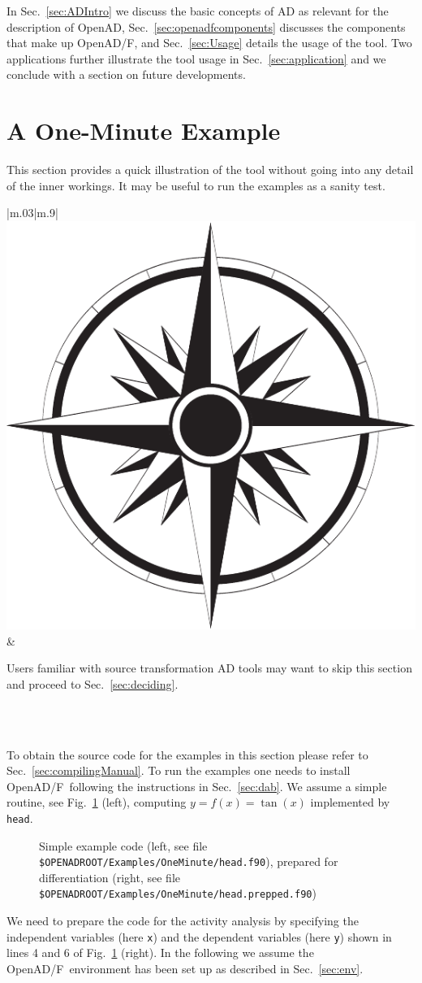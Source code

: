 \documentclass{book}
\newcommand{\OpenADF}{OpenAD/F}
\newcommand{\OpenAD}{OpenAD}
\newcommand{\refsec}[1]{{Sec.~\ref{#1}}}
\newcommand{\reffig}[1]{{Fig.~\ref{#1}}}
\newcommand{\nav}[1]{
\begin{tabular}{|m{.03\textwidth}|m{.9\textwidth}|}\hline
\vspace{1mm}
\includegraphics[width=.03\textwidth]{windrose_zh1}&
\vspace{1mm}
\begin{minipage}[c]{.86\textwidth}
\small {#1}
\end{minipage}
\vspace{1mm}
\\\hline
\end{tabular}
}
\begin{document}
In \refsec{sec:ADIntro} we discuss the basic concepts of AD as relevant for 
the description of \OpenAD, \refsec{sec:openadfcomponents} discusses the components 
that make up \OpenADF, and \refsec{sec:Usage} details the usage of the tool. 
Two applications further illustrate the tool usage in \refsec{sec:application} and 
we conclude with a section on future developments.

\section{A One-Minute Example} \label{sec:oneMinute}

This section provides a quick illustration of the tool without going into any detail of 
the inner workings. It may be useful to run the examples as a sanity test. \\
\nav{Users familiar with source transformation AD tools may want to skip this section and proceed  to \refsec{sec:deciding}.}\\
To obtain the source code for the examples in this section please refer to \refsec{sec:compilingManual}. 
To run the examples one needs to install \OpenADF\ following the instructions in \refsec{sec:dab}.
We assume a simple routine, see \reffig{fig:OneMinute} (left), computing $y=f(x)=\tan(x)$ implemented by \lstinline{head}.
\begin{figure}
\begin{minipage}[t]{.48\linewidth}
\scriptsize
\end{minipage}
\begin{minipage}[t]{.48\linewidth}
\scriptsize
\end{minipage}
\caption{Simple example code (left, see file 
\lstinline{$OPENADROOT/Examples/OneMinute/head.f90}), %
prepared for differentiation (right, see file 
\lstinline{$OPENADROOT/Examples/OneMinute/head.prepped.f90})}%
\label{fig:OneMinute}
\end{figure}
We need to prepare the code for the activity analysis by specifying the independent variables
(here \lstinline{x}) and the dependent variables 
(here \lstinline{y}) shown in lines 4 and 6 of \reffig{fig:OneMinute} (right).
In the following we assume the \OpenADF\ environment has been set up as 
described in \refsec{sec:env}.

\end{document}
